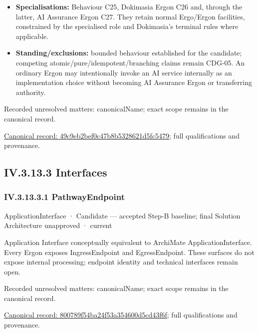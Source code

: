 \begin{itemize}
\item \textbf{Specialisations:} Behaviour C25, Dokimasia Ergon C26 and, through the latter,
  AI Assurance Ergon C27. They retain normal Ergo/Ergon facilities, constrained
  by the specialised role and Dokimasia's terminal rules where applicable.

\item \textbf{Standing/exclusions:} bounded behaviour established for the candidate;
  competing atomic/pure/idempotent/branching claims remain CDG-05. An ordinary
  Ergon may intentionally invoke an AI service internally as an implementation
  choice without becoming AI Assurance Ergon or transferring authority.

\end{itemize}

{\small Recorded unresolved matters: canonicalName; exact scope remains in the canonical record.}\par
{\footnotesize \href{../../../../continuum/application/application-component/49c9eb2bef0c47b8b5328621d5fc5479.md}{Canonical record: 49c9eb2bef0c47b8b5328621d5fc5479}; full qualifications and provenance.}\par
\subsection*{IV.3.13.3 Interfaces}
\label{navigation:IV.3.13.3}

\subsubsection*{IV.3.13.3.1 PathwayEndpoint}
\label{navigation:IV.3.13.3.1}

\label{element:800789f54ba24f53a354600d5cd43f6f}
{\small ApplicationInterface · Candidate — accepted Step-B baseline; final Solution Architecture unapproved · current}\par

Application Interface conceptually equivalent to ArchiMate ApplicationInterface.
Every Ergon exposes IngressEndpoint and EgressEndpoint. These surfaces do not
expose internal processing; endpoint identity and technical interfaces remain open.


{\small Recorded unresolved matters: canonicalName; exact scope remains in the canonical record.}\par
{\footnotesize \href{../../../../continuum/application/application-interface/800789f54ba24f53a354600d5cd43f6f.md}{Canonical record: 800789f54ba24f53a354600d5cd43f6f}; full qualifications and provenance.}\par
